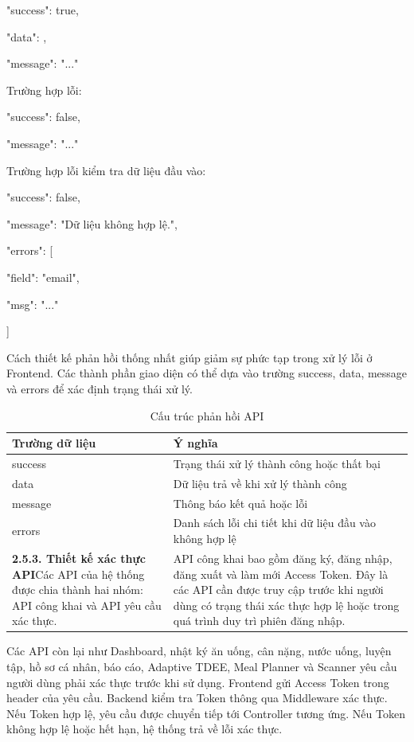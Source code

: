 {

  "success": true,

  "data": {},

  "message": "..."

}

Trường hợp lỗi:

{

  "success": false,

  "message": "..."

}

Trường hợp lỗi kiểm tra dữ liệu đầu vào:

{

  "success": false,

  "message": "Dữ liệu không hợp lệ.",

  "errors": [

    {

      "field": "email",

      "msg": "..."

    }

  ]

}

Cách thiết kế phản hồi thống nhất giúp giảm sự phức tạp trong xử lý lỗi ở Frontend. Các thành phần giao diện có thể dựa vào trường success, data, message và errors để xác định trạng thái xử lý.

\begin{table}[H]
\centering
\caption{Cấu trúc phản hồi API}
\begin{tabular}{|p{4cm}|p{11cm}|}
\hline
\textbf{Trường dữ liệu} & \textbf{Ý nghĩa} \\ \hline
success & Trạng thái xử lý thành công hoặc thất bại \\ \hline
data & Dữ liệu trả về khi xử lý thành công \\ \hline
message & Thông báo kết quả hoặc lỗi \\ \hline
errors & Danh sách lỗi chi tiết khi dữ liệu đầu vào không hợp lệ \\ \hline
\textbf{2.5.3. Thiết kế xác thực API}Các API của hệ thống được chia thành hai nhóm: API công khai và API yêu cầu xác thực. & API công khai bao gồm đăng ký, đăng nhập, đăng xuất và làm mới Access Token. Đây là các API cần được truy cập trước khi người dùng có trạng thái xác thực hợp lệ hoặc trong quá trình duy trì phiên đăng nhập. \\ \hline
\end{tabular}
\end{table}

Các API còn lại như Dashboard, nhật ký ăn uống, cân nặng, nước uống, luyện tập, hồ sơ cá nhân, báo cáo, Adaptive TDEE, Meal Planner và Scanner yêu cầu người dùng phải xác thực trước khi sử dụng. Frontend gửi Access Token trong header của yêu cầu. Backend kiểm tra Token thông qua Middleware xác thực. Nếu Token hợp lệ, yêu cầu được chuyển tiếp tới Controller tương ứng. Nếu Token không hợp lệ hoặc hết hạn, hệ thống trả về lỗi xác thực.

